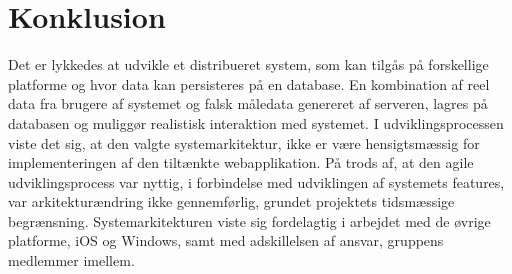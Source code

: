 \chapter{Konklusion}
Det er lykkedes at udvikle et distribueret system, som kan tilgås på forskellige platforme og hvor data kan persisteres på en database. En kombination af reel data fra brugere af systemet og falsk måledata genereret af serveren, lagres på databasen og muliggør realistisk interaktion med systemet. I udviklingsprocessen viste det sig, at den valgte systemarkitektur, ikke er være hensigtsmæssig for implementeringen af den tiltænkte webapplikation. På trods af, at den agile udviklingsprocess var nyttig, i forbindelse med udviklingen af systemets features, var arkitekturændring ikke gennemførlig, grundet projektets tidsmæssige begrænsning. Systemarkitekturen viste sig fordelagtig i arbejdet med de øvrige platforme, iOS og Windows, samt med adskillelsen af ansvar, gruppens medlemmer imellem.

%
%
%
%
%
%
